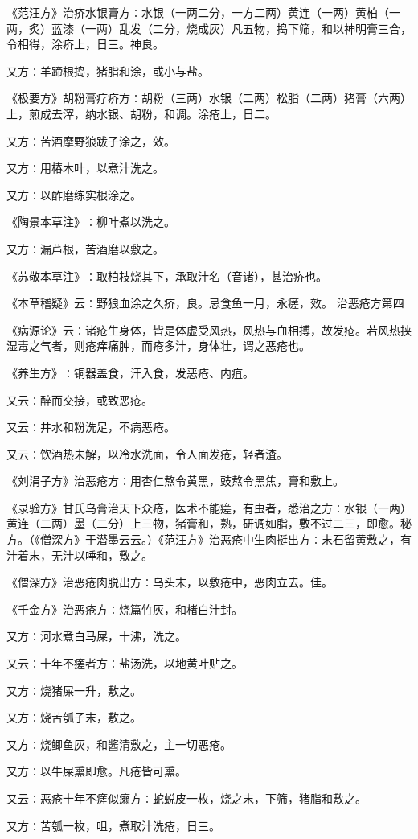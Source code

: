 \documentclass[a4paper,12pt,UTF8,twoside]{ctexbook}
\begin{document}
《范汪方》治疥水银膏方∶水银（一两二分，一方二两）黄连（一两）黄柏（一两，炙）蓝漆（一两）乱发（二分，烧成灰）凡五物，捣下筛，和以神明膏三合，令相得，涂疥上，日三。神良。

又方∶羊蹄根捣，猪脂和涂，或小与盐。

《极要方》胡粉膏疗疥方∶胡粉（三两）水银（二两）松脂（二两）猪膏（六两）上，煎成去滓，纳水银、胡粉，和调。涂疮上，日二。

又方∶苦酒摩野狼跋子涂之，效。

又方∶用椿木叶，以煮汁洗之。

又方∶以酢磨练实根涂之。

《陶景本草注》∶柳叶煮以洗之。

又方∶漏芦根，苦酒磨以敷之。

《苏敬本草注》∶取柏枝烧其下，承取汁名（音诸），甚治疥也。

《本草稽疑》云∶野狼血涂之久疥，良。忌食鱼一月，永瘥，效。
治恶疮方第四

《病源论》云∶诸疮生身体，皆是体虚受风热，风热与血相搏，故发疮。若风热挟湿毒之气者，则疮痒痛肿，而疮多汁，身体壮，谓之恶疮也。

《养生方》∶铜器盖食，汗入食，发恶疮、内疽。

又云∶醉而交接，或致恶疮。

又云∶井水和粉洗足，不病恶疮。

又云∶饮酒热未解，以冷水洗面，令人面发疮，轻者渣。

《刘涓子方》治恶疮方∶用杏仁熬令黄黑，豉熬令黑焦，膏和敷上。

《录验方》甘氏乌膏治天下众疮，医术不能瘥，有虫者，悉治之方∶水银（一两）黄连（二两）墨（二分）上三物，猪膏和，熟，研调如脂，敷不过二三，即愈。秘方。（《僧深方》于潜墨云云。）《范汪方》治恶疮中生肉挺出方∶末石留黄敷之，有汁着末，无汁以唾和，敷之。

《僧深方》治恶疮肉脱出方∶乌头末，以敷疮中，恶肉立去。佳。

《千金方》治恶疮方∶烧篇竹灰，和楮白汁封。

又方∶河水煮白马屎，十沸，洗之。

又云∶十年不瘥者方∶盐汤洗，以地黄叶贴之。

又方∶烧猪屎一升，敷之。

又方∶烧苦瓠子末，敷之。

又方∶烧鲫鱼灰，和酱清敷之，主一切恶疮。

又方∶以牛屎熏即愈。凡疮皆可熏。

又云∶恶疮十年不瘥似癞方∶蛇蜕皮一枚，烧之末，下筛，猪脂和敷之。

又方∶苦瓠一枚，咀，煮取汁洗疮，日三。
\end{document}
